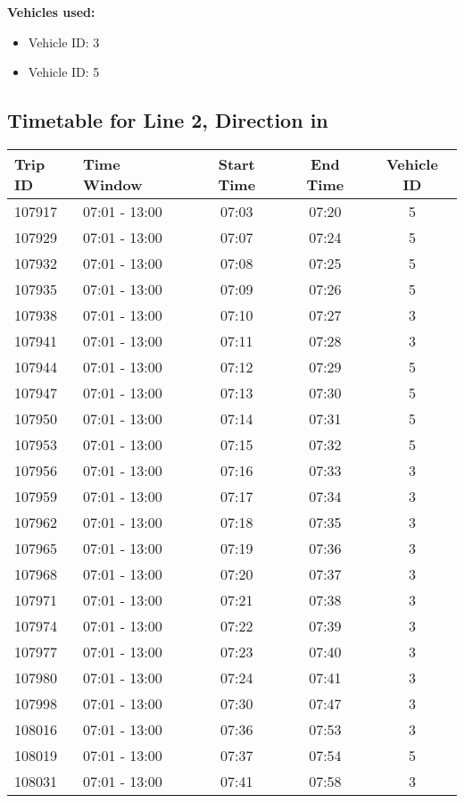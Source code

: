 \documentclass{article}
\begin{document}
\textbf{Vehicles used:}
\begin{itemize}
  \item Vehicle ID: 3
  \item Vehicle ID: 5
\end{itemize}

\subsection*{Timetable for Line 2, Direction in}
\begin{tabular}{llccc}
\toprule
Trip ID & Time Window & Start Time & End Time & Vehicle ID \\
\midrule
107917 & 07:01 - 13:00 & 07:03 & 07:20 & 5 \\
107929 & 07:01 - 13:00 & 07:07 & 07:24 & 5 \\
107932 & 07:01 - 13:00 & 07:08 & 07:25 & 5 \\
107935 & 07:01 - 13:00 & 07:09 & 07:26 & 5 \\
107938 & 07:01 - 13:00 & 07:10 & 07:27 & 3 \\
107941 & 07:01 - 13:00 & 07:11 & 07:28 & 3 \\
107944 & 07:01 - 13:00 & 07:12 & 07:29 & 5 \\
107947 & 07:01 - 13:00 & 07:13 & 07:30 & 5 \\
107950 & 07:01 - 13:00 & 07:14 & 07:31 & 5 \\
107953 & 07:01 - 13:00 & 07:15 & 07:32 & 5 \\
107956 & 07:01 - 13:00 & 07:16 & 07:33 & 3 \\
107959 & 07:01 - 13:00 & 07:17 & 07:34 & 3 \\
107962 & 07:01 - 13:00 & 07:18 & 07:35 & 3 \\
107965 & 07:01 - 13:00 & 07:19 & 07:36 & 3 \\
107968 & 07:01 - 13:00 & 07:20 & 07:37 & 3 \\
107971 & 07:01 - 13:00 & 07:21 & 07:38 & 3 \\
107974 & 07:01 - 13:00 & 07:22 & 07:39 & 3 \\
107977 & 07:01 - 13:00 & 07:23 & 07:40 & 3 \\
107980 & 07:01 - 13:00 & 07:24 & 07:41 & 3 \\
107998 & 07:01 - 13:00 & 07:30 & 07:47 & 3 \\
108016 & 07:01 - 13:00 & 07:36 & 07:53 & 3 \\
108019 & 07:01 - 13:00 & 07:37 & 07:54 & 5 \\
108031 & 07:01 - 13:00 & 07:41 & 07:58 & 3 \\

\end{tabular}
\end{document}

